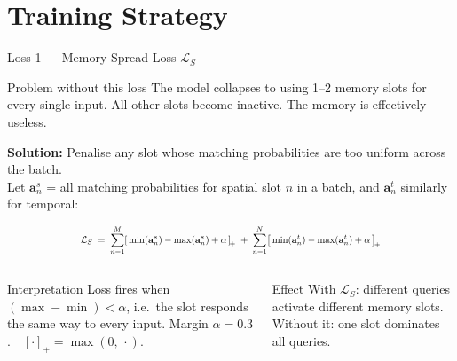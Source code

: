 \documentclass[aspectratio=169]{beamer}
\newcommand{\bt}[1]{\textbf{#1}}
\newcommand{\eq}[1]{\begin{equation*}#1\end{equation*}}
\begin{document}
\section{Training Strategy}

\begin{frame}{Loss 1 --- Memory Spread Loss $\mathcal{L}_S$}
  \vspace{-0.8em}
  \begin{alertblock}{Problem without this loss}
    \footnotesize The model collapses to using 1--2 memory slots for every single input. All other slots become inactive. The memory is effectively useless.
  \end{alertblock}

  \footnotesize
  \bt{Solution:} Penalise any slot whose matching probabilities are too uniform across the batch.\\
  Let $\mathbf{a}^s_n$ = all matching probabilities for spatial slot $n$ in a batch, and $\mathbf{a}^t_n$ similarly for temporal:

  \eq{\resizebox{0.7\linewidth}{!}{$\displaystyle
    \mathcal{L}_S \;=\;
    \sum_{n=1}^{M}\!\left[\,\min(\mathbf{a}^s_n) - \max(\mathbf{a}^s_n) + \alpha\,\right]_{\!+}
    \;+\;
    \sum_{n=1}^{N}\!\left[\,\min(\mathbf{a}^t_n) - \max(\mathbf{a}^t_n) + \alpha\,\right]_{\!+}
  $}}

  \begin{columns}[T]
      \begin{block}{Interpretation}
        \scriptsize Loss fires when $(\max - \min) < \alpha$, i.e.\ the slot responds the same way to every input. Margin $\alpha = 0.3$.\ \ $[\cdot]_+ = \max(0,\,\cdot)$.
      \end{block}
      \begin{exampleblock}{Effect}
        \scriptsize With $\mathcal{L}_S$: different queries activate different memory slots. Without it: one slot dominates all queries.
      \end{exampleblock}
  \end{columns}
\end{frame}
\end{document}
